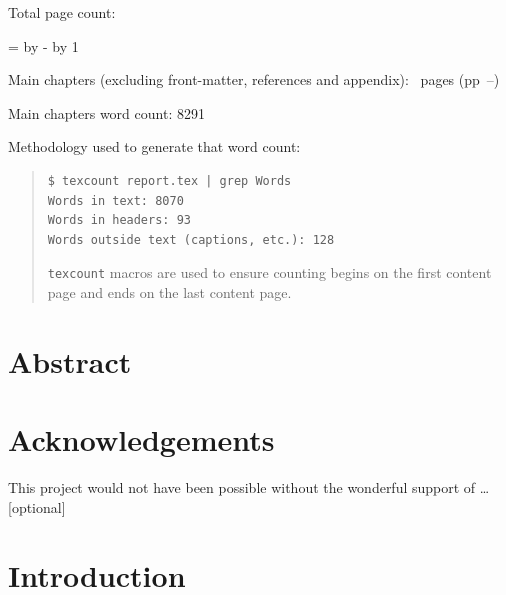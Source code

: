 \documentclass[12pt,a4paper,twoside]{report}
\newif\ifsubmission %
\begin{document}
\begin{sffamily}
\newpage

Total page count: \pageref{lastpage}

\makeatletter
\@tempcnta=\relax%
\advance\@tempcnta by -%
\advance\@tempcnta by 1%
\xdef\contentpages{\the\@tempcnta}%
\makeatother

Main chapters (excluding front-matter, references and appendix):
\contentpages~pages
(pp~\pageref{firstcontentpage}--\pageref{lastcontentpage})

Main chapters word count: 8291

Methodology used to generate that word count:

\begin{quote}
\begin{verbatim}
$ texcount report.tex | grep Words
Words in text: 8070
Words in headers: 93
Words outside text (captions, etc.): 128
\end{verbatim}

\texttt{texcount} macros are used to ensure counting begins on the first content page and ends on the last content page.
\end{quote}

\end{sffamily}

\onehalfspacing

\chapter*{Abstract}


\ifsubmission\else

\chapter*{Acknowledgements}

This project would not have been possible without the wonderful
support of \ldots [optional]

\fi
\cleardoublepage %

\setcounter{tocdepth}{1} %
\tableofcontents


\chapter{Introduction}
\label{firstcontentpage} %
\label{chap:introduction}
\end{document}
